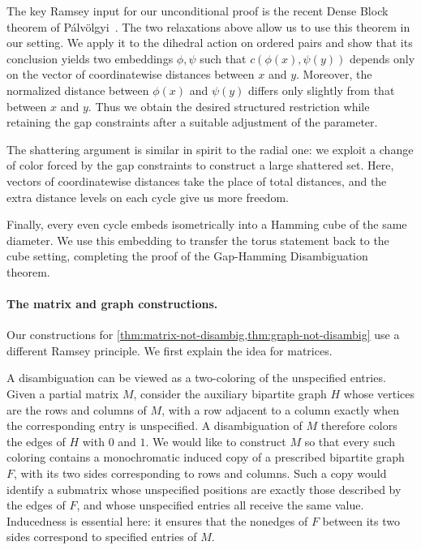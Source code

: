 \documentclass[11pt]{article}
\theoremstyle{remark}
\begin{document}
The key Ramsey input for our unconditional proof is the recent Dense Block theorem of Pálvölgyi~\cite{Palvolgyi26}.
The two relaxations above allow us to use this theorem in our setting.
We apply it to the dihedral action on ordered pairs and show that its conclusion yields two embeddings $\phi,\psi$ such that $c(\phi(x),\psi(y))$ depends only on the vector of coordinatewise distances between $x$ and $y$.
Moreover, the normalized distance between $\phi(x)$ and $\psi(y)$ differs only slightly from that between $x$ and $y$.
Thus we obtain the desired structured restriction while retaining the gap constraints after a suitable adjustment of the parameter.

The shattering argument is similar in spirit to the radial one: we exploit a change of color forced by the gap constraints to construct a large shattered set.
Here, vectors of coordinatewise distances take the place of total distances, and the extra distance levels on each cycle give us more freedom.

Finally, every even cycle embeds isometrically into a Hamming cube of the same diameter.
We use this embedding to transfer the torus statement back to the cube setting, completing the proof of the Gap-Hamming Disambiguation theorem.

\medskip

\paragraph{The matrix and graph constructions.}

Our constructions for \cref{thm:matrix-not-disambig,thm:graph-not-disambig} use a different Ramsey principle.
We first explain the idea for matrices.

A disambiguation can be viewed as a two-coloring of the unspecified entries.
Given a partial matrix $M$, consider the auxiliary bipartite graph $H$ whose vertices are the rows and columns of $M$, with a row adjacent to a column exactly when the corresponding entry is unspecified.
A disambiguation of $M$ therefore colors the edges of $H$ with $0$ and $1$.
We would like to construct $M$ so that every such coloring contains a monochromatic induced copy of a prescribed bipartite graph $F$, with its two sides corresponding to rows and columns.
Such a copy would identify a submatrix whose unspecified positions are exactly those described by the edges of $F$, and whose unspecified entries all receive the same value.
Inducedness is essential here: it ensures that the nonedges of $F$ between its two sides correspond to specified entries of $M$.
\end{document}
